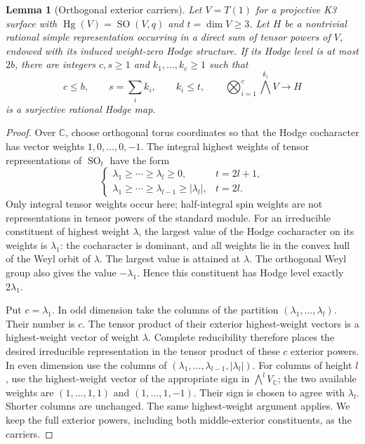 \documentclass[11pt]{amsart}
\newcommand{\C}{\mathbb C}
\DeclareMathOperator{\SO}{SO}
\newtheorem{lemma}[theorem]{Lemma}
\theoremstyle{definition}
\theoremstyle{remark}
\numberwithin{equation}{section}
\begin{document}
\begin{lemma}[Orthogonal exterior carriers]
\label{ghc:lem:orthogonal-carriers}
Let $V=T(1)$ for a projective K3 surface with
$\operatorname{Hg}(V)=\SO(V,q)$ and $t=\dim V\ge3$.
Let $H$ be a nontrivial rational simple representation occurring
in a direct sum of tensor powers of $V$, endowed with its induced
weight-zero Hodge structure.  If its Hodge level is at most $2b$,
there are integers $c,s\ge1$ and $k_1,\ldots,k_c\ge1$ such that
\[
 c\le b,\qquad s=\sum_i k_i,\qquad k_i\le t,
 \qquad \bigotimes_{i=1}^c\bigwedge^{k_i}V\longrightarrow H
\]
is a surjective rational Hodge map.
\end{lemma}
\begin{proof}
Over $\C$, choose orthogonal torus coordinates so that the Hodge
cocharacter has vector weights $1,0,\ldots,0,-1$.  The integral
highest weights of tensor representations of $\SO_t$ have the form
\[
 \begin{cases}
 \lambda_1\ge\cdots\ge\lambda_l\ge0,&t=2l+1,\\
 \lambda_1\ge\cdots\ge\lambda_{l-1}\ge|\lambda_l|,&t=2l.
 \end{cases}
\]
Only integral tensor weights occur here; half-integral spin weights
are not representations in tensor powers of the standard module.
For an irreducible constituent of highest weight $\lambda$, the
largest value of the Hodge cocharacter on its weights is
$\lambda_1$: the cocharacter is dominant, and all weights lie in
the convex hull of the Weyl orbit of $\lambda$.  The largest value
is attained at $\lambda$.  The orthogonal Weyl group also gives
the value $-\lambda_1$.  Hence this constituent has Hodge level
exactly $2\lambda_1$.

Put $c=\lambda_1$.  In odd dimension take the columns of the
partition $(\lambda_1,\ldots,\lambda_l)$.  Their number is $c$.
The tensor product of their exterior highest-weight vectors is a
highest-weight vector of weight $\lambda$.  Complete reducibility
therefore places the desired irreducible representation in the
tensor product of these $c$ exterior powers.  In even dimension use
the columns of $(\lambda_1,\ldots,\lambda_{l-1},|\lambda_l|)$.
For columns of height $l$, use the highest-weight vector of the
appropriate sign in $\bigwedge^lV_\C$; the two available weights
are $(1,\ldots,1,1)$ and $(1,\ldots,1,-1)$.
Their sign is chosen to agree with $\lambda_l$.  Shorter columns
are unchanged.  The same highest-weight argument applies.  We keep
the full exterior powers, including both middle-exterior
constituents, as the carriers.


\end{proof}
\end{document}
